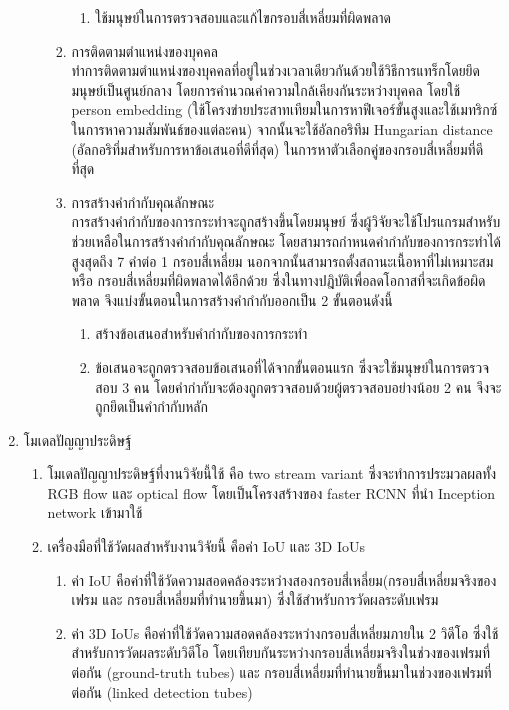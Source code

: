 \begin{enumerate}
\begin{enumerate}
\begin{enumerate}
\begin{enumerate}
				\item ใช้มนุษย์ในการตรวจสอบและแก้ไขกรอบสี่เหลี่ยมที่ผิดพลาด
			\end{enumerate}	
			\item การติดตามตำแหน่งของบุคคล\\
			ทำการติดตามตำแหน่งของบุคคลที่อยู่ในช่วงเวลาเดียวกันด้วยใช้วิธีการแทร็กโดยยึดมนุษย์เป็นศูนย์กลาง โดยการคำนวณค่าความใกล้เคียงกันระหว่างบุคคล 
			โดยใช้ person embedding (ใช้โครงข่ายประสาทเทียมในการหาฟีเจอร์ขั้นสูงและใช้เมทริกซ์ในการหาความสัมพันธ์ของแต่ละคน) จากนั้นจะใช้อัลกอริทึม Hungarian distance (อัลกอริทึ่มสำหรับการหาข้อเสนอที่ดีที่สุด) ในการหาตัวเลือกคู่ของกรอบสี่เหลี่ยมที่ดีที่สุด
			\item การสร้างคำกำกับคุณลักษณะ\\
			การสร้างคำกำกับของการกระทำจะถูกสร้างขึ้นโดยมนุษย์ ซึ่งผู้วิจัยจะใช้โปรแกรมสำหรับช่วยเหลือในการสร้างคำกำกับคุณลักษณะ โดยสามารถกำหนดคำกำกับของการกระทำได้สูงสุดถึง 7 คำต่อ 1 กรอบสี่เหลี่ยม นอกจากนั้นสามารถตั้งสถานะเนื้อหาที่ไม่เหมาะสม หรือ กรอบสี่เหลี่ยมที่ผิดพลาดได้อีกด้วย ซึ่งในทางปฎิบัติเพื่อลดโอกาสที่จะเกิดข้อผิดพลาด จึงแบ่งขั้นตอนในการสร้างคำกำกับออกเป็น 2 ขั้นตอนดังนี้
			\begin{enumerate}
				\setlength\itemsep{-0.25em}
				\item สร้างข้อเสนอสำหรับคำกำกับของการกระทำ
				\item ข้อเสนอจะถูกตรวจสอบข้อเสนอที่ได้จากขั้นตอนแรก ซึ่งจะใช้มนุษย์ในการตรวจสอบ 3 คน โดยคำกำกับจะต้องถูกตรวจสอบด้วยผู้ตรวจสอบอย่างน้อย 2 คน จึงจะถูกยึดเป็นคำกำกับหลัก
			\end{enumerate}
		\end{enumerate}
	\end{enumerate}
	\item {โมเดลปัญญาประดิษฐ์}
	\begin{enumerate}
		\item โมเดลปัญญาประดิษฐ์ที่งานวิจัยนี้ใช้ คือ two stream variant ซึ่งจะทำการประมวลผลทั้ง RGB flow และ optical flow 
		โดยเป็นโครงสร้างของ faster RCNN ที่นำ Inception network เข้ามาใช้
		\item เครื่องมือที่ใช้วัดผลสำหรับงานวิจัยนี้ คือค่า IoU และ 3D IoUs 
		\begin{enumerate}
			\item ค่า IoU คือค่าที่ใช้วัดความสอดคล้องระหว่างสองกรอบสี่เหลี่ยม(กรอบสี่เหลี่ยมจริงของเฟรม และ กรอบสี่เหลี่ยมที่ทำนายขึ้นมา) ซึ่งใช้สำหรับการวัดผลระดับเฟรม 
			\item ค่า 3D IoUs คือค่าที่ใช้วัดความสอดคล้องระหว่างกรอบสี่เหลี่ยมภายใน 2 วิดีโอ ซึ่งใช้สำหรับการวัดผลระดับวิดีโอ โดยเทียบกันระหว่างกรอบสี่เหลี่ยมจริงในช่วงของเฟรมที่ต่อกัน (ground-truth tubes) และ กรอบสี่เหลี่ยมที่ทำนายขึ้นมาในช่วงของเฟรมที่ต่อกัน (linked detection tubes) 

\end{enumerate}
\end{enumerate}
\end{enumerate}
